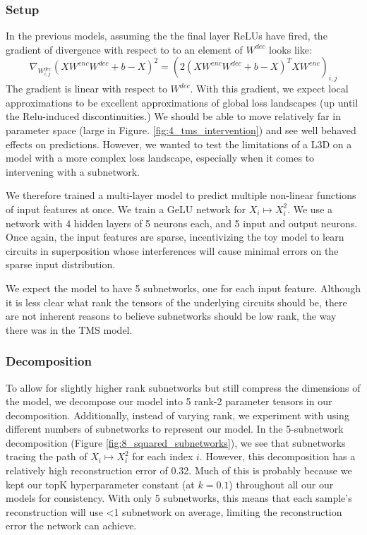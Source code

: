 \documentclass{article}
\theoremstyle{plain}
\theoremstyle{definition}
\theoremstyle{remark}
\begin{document}
\subsubsection{Setup}

In the previous models, assuming the the final layer ReLUs have fired, the gradient of divergence with respect to  to an element of $W^{dec}$ looks like:
\begin{equation}
  \nabla_{W^{dec}_{i,j}} ( X W^{enc}W^{dec} + b - X)^2 = (2 (X W^{enc} W^{dec} + b- X)^T X W^{enc})_{i,j}
\end{equation}
The gradient is linear with respect to $W^{dec}$. With this gradient, we expect local approximations to be excellent approximations of global loss landscapes (up until the Relu-induced discontinuities.) We should be able to move relatively far in parameter space (large \delta in Figure. \ref{fig:4_tms_intervention}) and see well behaved effects on predictions. However, we wanted to test the limitations of a L3D on a model with a more complex loss landscape, especially when it comes to intervening with a subnetwork.

We therefore trained a multi-layer model to predict multiple non-linear functions of input features at once. We train a GeLU network for $X_i \mapsto X_i^2$. We use a network with 4 hidden layers of 5 neurons each, and 5 input and output neurons. Once again, the input features are sparse, incentivizing the toy model to learn circuits in superposition whose interferences will cause minimal errors on the sparse input distribution. 

We expect the model to have 5 subnetworks, one for each input feature. Although it is less clear what rank the tensors of the underlying circuits should be, there are not inherent reasons to believe subnetworks should be low rank, the way there was in the TMS model. 

\subsubsection{Decomposition}

To allow for slightly higher rank subnetworks but still compress the dimensions of the model, we decompose our model into 5 rank-2 parameter tensors in our decomposition. Additionally, instead of varying rank, we experiment with using different numbers of subnetworks to represent our model. In the 5-subnetwork decomposition (Figure \ref{fig:8_squared_subnetworks}), we see that subnetworks tracing the path of $X_i \mapsto X_i^2$ for each index $i$. However, this decomposition has a relatively high reconstruction error of 0.32. Much of this is probably because we kept our $\text{topK}$ hyperparameter constant (at $k=0.1$) throughout all our our models for consistency.  With only 5 subnetworks, this means that each sample's reconstruction will use <1 subnetwork on average,  limiting the reconstruction error the network can achieve. 
\end{document}
